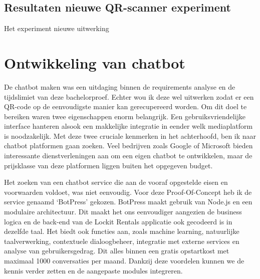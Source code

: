 \subsection{Resultaten nieuwe QR-scanner experiment}
\label{sec:nieuweUitwerkingExperiment}

Het experiment nieuwe uitwerking

\section{Ontwikkeling van chatbot}%

De chatbot maken was een uitdaging binnen de requirements analyse en de tijdslimiet van deze bachelorproef. Echter wou ik deze wel uitwerken zodat er een QR-code op de eenvoudigste manier kan gerecupereerd worden. Om dit doel te bereiken waren twee eigenschappen enorm belangrijk. Een gebruiksvriendelijke interface hanteren alsook een makkelijke integratie in eender welk mediaplatform is noodzakelijk. Met deze twee cruciale kenmerken in het achterhoofd, ben ik naar chatbot platformen gaan zoeken. Veel bedrijven zoals Google of Microsoft bieden interessante dienstverleningen aan om een eigen chatbot te ontwikkelen, maar de prijsklasse van deze platformen liggen buiten het opgegeven budget.

Het zoeken van een chatbot service die aan de vooraf opgestelde eisen en voorwaarden voldoet, was niet eenvoudig. Voor deze Proof-Of-Concept heb ik de service genaamd ‘BotPress’ gekozen. BotPress maakt gebruik van Node.js en een modulaire architectuur. Dit maakt het ons eenvoudiger aangezien de business logica en de back-end van de Lockit Rentals applicatie ook gecodeerd is in dezelfde taal. Het biedt ook functies aan, zoals machine learning, natuurlijke taalverwerking, contextuele dialoogbeheer, integratie met externe services en analyse van gebruikersgedrag. Dit alles binnen een gratis opstartkost met maximaal 1000 conversaties per maand. Dankzij deze voordelen kunnen we de kennis verder zetten en de aangepaste modules integreren.

